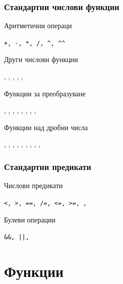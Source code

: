 \documentclass[alsotrans]{beamerswitch}
\begin{document}
\begin{frame}
  \frametitle{Стандартни числови функции}

  Аритметични операци

  \tt{+}, \tt{-}, \tt{*}, \tt{/}, \tt{\^{}}, \tt{\^{}\^{}}

  \vspace{2ex}
  Други числови функции

  , , , , , 

  \vspace{2ex}
  Функции за преобразуване

  , , , , , , , , 

  \vspace{2ex}
  Функции над дробни числа

  , , , , , , , , , \lst{**}
\end{frame}

\begin{frame}
  \frametitle{Стандартни предикати}

  Числови предикати

  \tt{<}, \tt{>}, \tt{==}, \tt{/=}, \tt{<=}, \tt{>=}, , 

  \vspace{2ex}
  Булеви операции

  \tt{\&\&}, \tt{||}, 
\end{frame}

\section{Функции}
\end{document}
